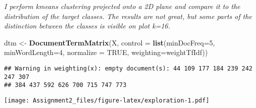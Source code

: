 \documentclass[]{article}
\newenvironment{Shaded}{\begin{snugshade}}{\end{snugshade}}
\newcommand{\DataTypeTok}[1]{\textcolor[rgb]{0.13,0.29,0.53}{#1}}
\newcommand{\DecValTok}[1]{\textcolor[rgb]{0.00,0.00,0.81}{#1}}
\newcommand{\FloatTok}[1]{\textcolor[rgb]{0.00,0.00,0.81}{#1}}
\newcommand{\KeywordTok}[1]{\textcolor[rgb]{0.13,0.29,0.53}{\textbf{#1}}}
\newcommand{\NormalTok}[1]{#1}
\newcommand{\OperatorTok}[1]{\textcolor[rgb]{0.81,0.36,0.00}{\textbf{#1}}}
\newcommand{\OtherTok}[1]{\textcolor[rgb]{0.56,0.35,0.01}{#1}}
\newcommand{\StringTok}[1]{\textcolor[rgb]{0.31,0.60,0.02}{#1}}
\begin{document}
\emph{I perform kmeans clustering projected onto a 2D plane and compare
it to the distribution of the target classes. The results are not great,
but some parts of the distinction between the classes is visible on plot
k=16.}

\begin{Shaded}
\begin{Highlighting}[]
\NormalTok{dtm <-}\StringTok{ }\KeywordTok{DocumentTermMatrix}\NormalTok{(X, }\DataTypeTok{control =} \KeywordTok{list}\NormalTok{(}\DataTypeTok{minDocFreq=}\DecValTok{5}\NormalTok{, }\DataTypeTok{minWordLength=}\DecValTok{4}\NormalTok{, }\DataTypeTok{normalize =} \OtherTok{TRUE}\NormalTok{, }\DataTypeTok{weighting=}\NormalTok{weightTfIdf))}
\end{Highlighting}
\end{Shaded}

\begin{verbatim}
## Warning in weighting(x): empty document(s): 44 109 177 184 239 242 247 307
## 384 437 592 626 700 715 747 773
\end{verbatim}

\begin{Shaded}
\end{Shaded}

\texttt{[image: Assignment2\_files/figure-latex/exploration-1.pdf]}
\end{document}
